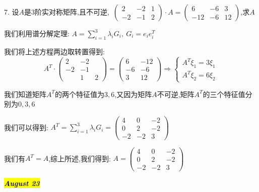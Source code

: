7. 设$A$是$3$阶实对称矩阵,且不可逆,\ $\left(\begin{matrix}
	2&-2&1\\-2&-1&2
\end{matrix} \right)\cdot A=\left(\begin{matrix}
6&-6&3\\-12&-6&12
\end{matrix} \right) $,求$A$
\begin{solution}

	我们利用谱分解定理:  $A=\sum\limits_{i=1}^{3}\lambda_{i}G_{i},\ G_{i}=e_{i}e_{i}^{T}$
	
	我们将上述方程两边取转置得到:  
	$$A^{T}\cdot\left(\begin{matrix}
		2&-2\\-2&-1\\&1&2
	\end{matrix} \right)=\left(\begin{matrix}
	6&-12\\-6&-6\\3&12
\end{matrix} \right)\Rightarrow \left\lbrace
\begin{array}{l}
A^{T}\xi_{1}=3\xi_{1}\\
A^{T}\xi_{2}=6\xi_{2}
\end{array}
\right. $$

我们知道矩阵$A^{T}$的两个特征值为$3,6$,又因为矩阵$A$不可逆,矩阵$A^{T}$的三个特征值分别为$0,3,6$

我们可以得到:  $A^{T}=\sum\limits_{i=1}^{3}\lambda_{i}G_{i}=\left(\begin{matrix}
	4&0&-2\\0&2&-2\\-2&-2&3
\end{matrix} \right)$

我们有$A^{T}=A$,综上所述,我们得到:  $A=\left(\begin{matrix}
	4&0&-2\\0&2&-2\\-2&-2&3
\end{matrix} \right)$
\end{solution}

\hl{\textbf{\textit{August 23}}}

